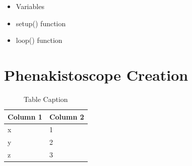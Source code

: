 \begin{itemize}
	\item Variables
	\item setup() function
	\item loop() function
\end{itemize}


\section*{Phenakistoscope Creation}


\citep{kalif-15-a} \citep{kalif-15-b}


%
\begin{table}
	\centering
	\begin{tabular}{p{4cm} l}
		\toprule
		Column 1 & Column 2\\ \midrule
		x & 1 \\
		y & 2 \\
		z & 3 \\
		\bottomrule
	\end{tabular}
	\caption{Table Caption}
	\label{tab:table_label}
\end{table}
%